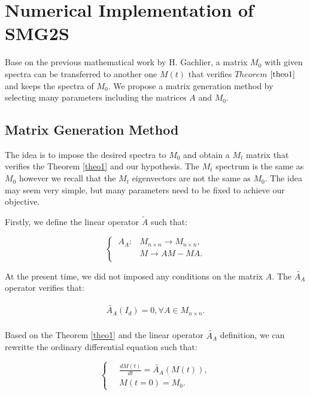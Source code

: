 \section{Numerical Implementation of SMG2S} \label{Matrix_Generation_Method}
Base on the previous mathematical work by H. Gachlier, a matrix $M_0$ with given spectra can be transferred to another one $M(t)$ that verifies $Theorem$ $\ref{theo1}$ and keeps the spectra of $M_0$. We propose a matrix generation method by selecting many parameters including the matrices $A$ and $M_0$. 

\subsection{Matrix Generation Method}

The idea is to impose the desired spectra to $M_0$ and obtain a $M_t$ matrix that verifies the Theorem \ref{theo1} and our hypothesis. The $M_t$ spectrum is the same as $M_0$ however we recall that the $M_t$ eigenvectors are not the same as $M_0$. The idea may seem very simple, but many parameters need to be fixed to achieve our objective.

Firstly, we define the linear operator $\widetilde{A}$ such that:

\begin{equation}
\left\{\
\begin{aligned}
A_A: &M_{n \times n} \rightarrow M_{n \times n}, \\
&M \rightarrow  AM-MA. \\ 
\end{aligned}
\right.
\end{equation}

At the present time, we did not imposed any conditions on the matrix $A$. The $\widetilde{A_A}$
operator verifies that:

\begin{equation}
\begin{aligned}
\widetilde{A_A}(I_d)=0, \forall A \in M_{n \times n}. \\ 
\end{aligned}
\end{equation}

Based on the Theorem \ref{theo1} and the linear operator $\widetilde{A_A}$ definition, we can rewritte the
ordinary differential equation such that:

\begin{equation}
\label{eq3}
\left\{\
\begin{aligned} 
&\frac{dM(t)}{dt} =  \widetilde{A_A}(M(t)), \\ 
&M(t=0) =  M_0.
\end{aligned}
\right.
\end{equation}

